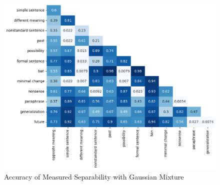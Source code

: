 \documentclass[11pt]{article}
\begin{document}
\begin{figure}[htp]
    \centering
    \includegraphics[scale=0.4]{figs/GM.png}
    \caption{Accuracy of Measured Separability with Gaussian
    Mixture}\label{fig:GM}
\end{figure}










\end{document}
